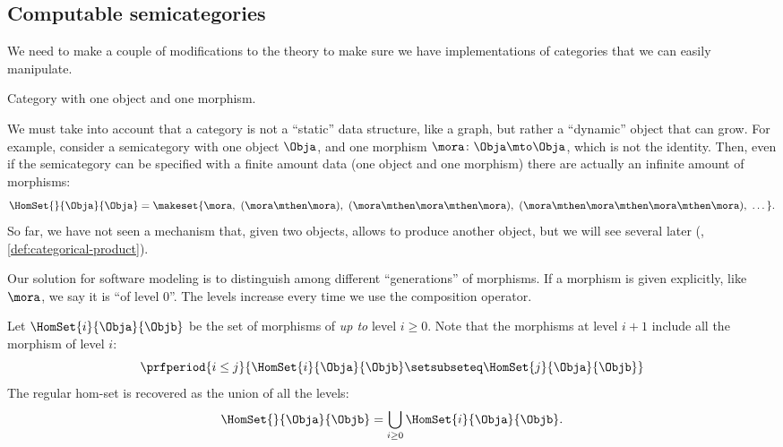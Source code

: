 \label{sec:exercise-semicategories}

\subsection{Computable semicategories}

We need to make a couple of modifications to the theory to make sure we have implementations of categories that we can easily manipulate.

\begin{marginfigure}
    \vspace{-1cm}
    \caption{Category with one object and one morphism.}
    \label{fig:cat_natnotzero}
\end{marginfigure}

We must take into account that a category is not a ``static'' data structure, like a graph, but rather a ``dynamic'' object that can grow.
For example, consider a semicategory with one object $\Obja$, and one morphism $\mora\colon\Obja \mto \Obja$, which is not the identity.
Then, even if the semicategory can be specified with a finite amount data (one object and one morphism) there are actually an infinite amount of morphisms:
\begin{equation}
    \HomSet{}{\Obja}{\Obja} = \makeset{\mora,\ (\mora\mthen\mora),\ (\mora\mthen\mora\mthen\mora),\ (\mora\mthen\mora\mthen\mora\mthen\mora),\ \dots}.
\end{equation}
So far, we have not seen a mechanism that, given two objects, allows to produce another object, but we will see several later (\eg, \cref{def:categorical-product}).

Our solution for software modeling is to distinguish among different ``generations'' of morphisms.
If a morphism is given explicitly, like $\mora$, we say it is ``of level 0''.
The levels increase every time we use the composition operator.

Let $\HomSet{i}{\Obja}{\Objb}$ be the set of morphisms of \emph{up to} level $i\geq 0$.
Note that the morphisms at level $i+1$ include all the morphism of level $i$:
\begin{equation}
    \prfperiod{
        i \leq j
    }{
        \HomSet{i}{\Obja}{\Objb} \setsubseteq \HomSet{j}{\Obja}{\Objb}
    }
\end{equation}
The regular hom-set is recovered as the union of all the levels:
\begin{equation}
    \HomSet{}{\Obja}{\Objb} = \bigcup_{i\geq0} \HomSet{i}{\Obja}{\Objb}.
\end{equation}

